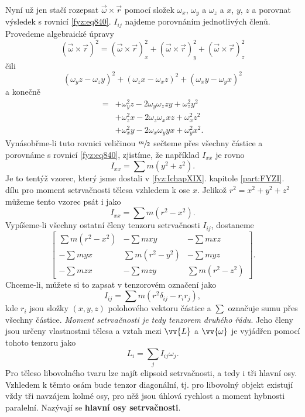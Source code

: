     Nyní už jen stačí rozepsat \(\vec{ω}\times\vec{r}\) pomocí složek \(ω_x\), \(ω_y\) a \(ω_z\) a
    \(x\), \(y\), \(z\) a porovnat výsledek s rovnicí \eqref{fyz:eq840}. \(I_{ij}\) najdeme
    porovnáním jednotlivých členů. Provedeme algebraické úpravy
    \begin{equation*}
      (\vec{ω}×\vec{r})^2=(\vec{ω}×\vec{r})^2_x+(\vec{ω}×\vec{r})^2_y+(\vec{ω}×\vec{r})^2_z
    \end{equation*}
    čili
    \begin{equation*}
      (ω_yz−ω_zy)^2+(ω_zx−ω_xz)^2+(ω_xy−ω_yx)^2
    \end{equation*}
    a konečně
    \begin{align*}
      = &+ω_y^2z − 2ω_yω_z zy + ω_z^2y^2 \\
        &+ω_z^2x − 2ω_zω_x xz + ω_x^2z^2 \\
        &+ω_x^2y − 2ω_xω_y yx + ω_y^2x^2.
    \end{align*}
    Vynásobřme-li tuto rovnici veličinou \(\sfrac{m}{2}\) sečteme přes všechny částice a porovnáme s
    rovnicí \eqref{fyz:eq840}, zjistíme, že například \(I_{xx}\) je rovno
    \begin{equation*}
      I_{xx}=∑m(y^2+z^2).
    \end{equation*}
    Je to tentýž vzorec, který jsme dostali v \ref{fyz:IchapXIX}. kapitole \ref{part:FYZI}. dílu pro
    moment setrvačnosti tělesa vzhledem k ose \(x\). Jelikož \(r^2 = x^2 + y^2 + z^2\) můžeme tento
    vzorec psát i jako
    \begin{equation*}
      I_{xx}=∑m(r^2-x^2).
    \end{equation*}
    Vypíšeme-li všechny ostatní členy tenzoru setrvačnosti \(I_{ij}\), dostaneme
    \begin{equation*}
      \begin{bmatrix}
        \sum m(r^2-x^2) &    -\sum mxy     &   -\sum mxz     \\
          -\sum myx     &  \sum m(r^2-y^2) &   -\sum myz     \\
          -\sum mzx     &    -\sum mzy     & \sum m(r^2-z^2)
      \end{bmatrix}.
    \end{equation*}
    Chceme-li, můžete si to zapsat v tenzorovém označení jako
    \begin{equation}\label{fyz:eq843}
      I_{ij}=\sum m(r^2\delta_{ij}-r_ir_j),
    \end{equation}
    kde \(r_i\) jsou složky \((x, y, z)\) polohového vektoru částice a \(\sum\) označuje sumu přes
    všechny částice. \emph{Moment setrvačnosti je tedy tenzorem druhého řádu}. Jeho členy jsou
    určeny vlastnostmi tělesa a vztah mezi \(\vv{L}\) a \(\vv{\omega}\) je vyjádřen pomocí tohoto
    tenzoru jako
    \begin{equation}\label{fyz:eq844}
      L_i=\sum_jI_{ij}\omega_j.
    \end{equation}
    Pro těleso libovolného tvaru lze najít elipsoid setrvačnosti, a tedy i tři hlavní osy. Vzhledem
    k těmto osám bude tenzor diagonální, tj. pro libovolný objekt existují vždy tři navzájem kolmé
    osy, pro něž jsou úhlová rychlost a moment hybnosti paralelní. Nazývají se \textbf{hlavní osy
    setrvačnosti}.

